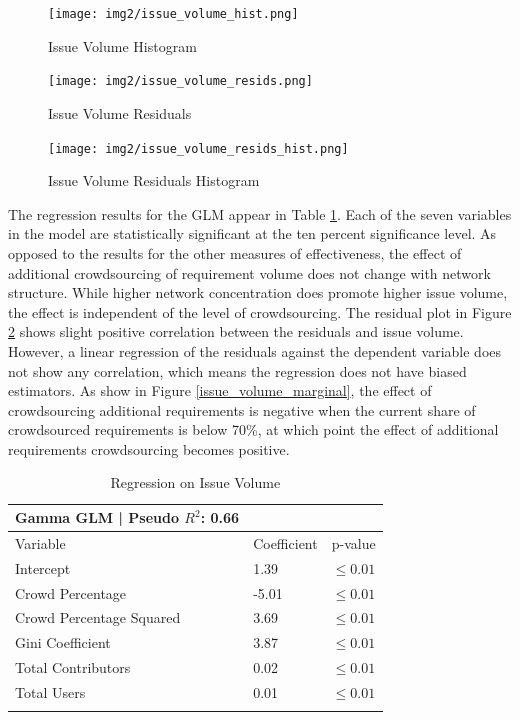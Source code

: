 \begin{figure}
  \texttt{[image: img2/issue\_volume\_hist.png]}
\caption{Issue Volume Histogram}
\label{issue_volume_hist}
\end{figure}

\begin{figure}
  \texttt{[image: img2/issue\_volume\_resids.png]}
\caption{Issue Volume Residuals}
\label{issue_volume_resids}
\end{figure}

\begin{figure}
  \texttt{[image: img2/issue\_volume\_resids\_hist.png]}
\caption{Issue Volume Residuals Histogram}
\label{issue_volume_resids_hist}
\end{figure}

The regression results for the GLM appear in Table \ref{issue_volume_regression}. Each of the seven variables in the model are statistically significant at the ten percent significance level. As opposed to the results for the other measures of effectiveness, the effect of additional crowdsourcing of requirement volume does not change with network structure. While higher network concentration does promote higher issue volume, the effect is independent of the level of crowdsourcing. The residual plot in Figure \ref{issue_volume_resids} shows slight positive correlation between the residuals and issue volume. However, a linear regression of the residuals against the dependent variable does not show any correlation, which means the regression does not have biased estimators. As show in Figure \ref{issue_volume_marginal}, the effect of crowdsourcing additional requirements is negative when the current share of crowdsourced requirements is below 70\%, at which point the effect of additional requirements crowdsourcing becomes positive.

\begin{table}
\caption{Regression on Issue Volume}
\label{issue_volume_regression}
\begin{tabular}{lll}
Gamma GLM | Pseudo $R^2$: 0.66 \\
\hline\noalign{\smallskip}
Variable & Coefficient & p-value  \\
\noalign{\smallskip}\hline\noalign{\smallskip}
Intercept & 1.39 & $\leq 0.01$ \\
Crowd Percentage &  -5.01 & $\leq 0.01$  \\
Crowd Percentage Squared & 3.69 & $\leq 0.01$  \\
Gini Coefficient & 3.87 & $\leq 0.01$  \\
Total Contributors & 0.02 & $\leq 0.01$ \\
Total Users & 0.01 & $\leq 0.01$ \\
\noalign{\smallskip}\hline
\end{tabular}
\end{table}

